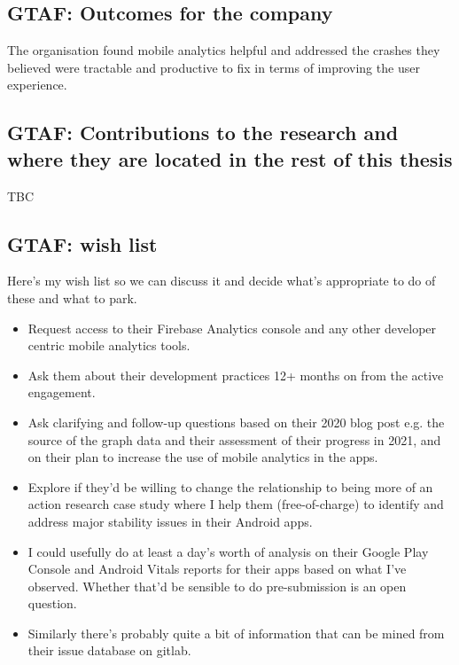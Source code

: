 \subsection{GTAF: Outcomes for the company}
The organisation found mobile analytics helpful and addressed the crashes they believed were tractable and productive to fix in terms of improving the user experience.


\subsection{GTAF: Contributions to the research and where they are located in the rest of this thesis}
TBC


\subsection*{GTAF: wish list}
Here's my wish list so we can discuss it and decide what's appropriate to do of these and what to park.
{\small
\begin{itemize}
    \itemsep0em
    \item Request access to their Firebase Analytics console and any other developer centric mobile analytics tools.
    \item Ask them about their development practices 12+ months on from the active engagement.
    \item Ask clarifying and follow-up questions based on their 2020 blog post e.g. the source of the graph data and their assessment of their progress in 2021, and on their plan to increase the use of mobile analytics in the apps.
    \item Explore if they'd be willing to change the relationship to being more of an action research case study where I help them (free-of-charge) to identify and address major stability issues in their Android apps.
\end{itemize}

\begin{itemize}
    \itemsep0em
    \item I could usefully do at least a day's worth of analysis on their Google Play Console and Android Vitals reports for their apps based on what I've observed. Whether that'd be sensible to do pre-submission is an open question.
    \item Similarly there's probably quite a bit of information that can be mined from their issue database on gitlab.
\end{itemize}
}  %

